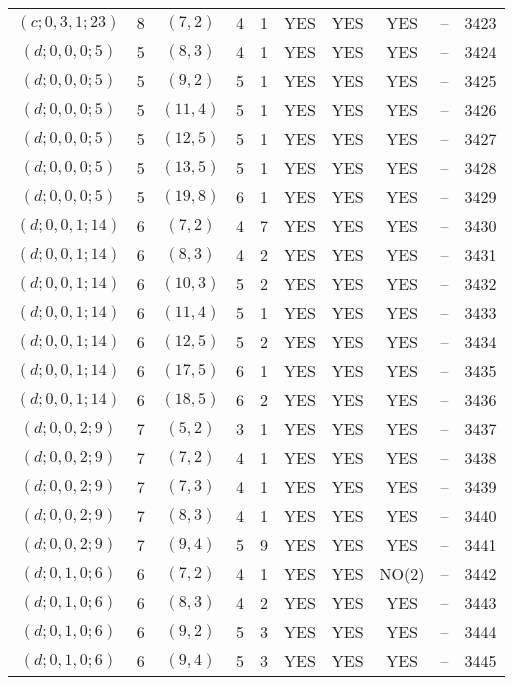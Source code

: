 \begin{longtable}{|c|c|c|c|c|c|c|c|c|c|}
$(c; 0, 3, 1; 23)$ & 8 & $(7, 2)$ & 4 & 1 & YES & YES & YES & -- & 3423\\
$(d; 0, 0, 0; 5)$ & 5 & $(8, 3)$ & 4 & 1 & YES & YES & YES & -- & 3424\\
$(d; 0, 0, 0; 5)$ & 5 & $(9, 2)$ & 5 & 1 & YES & YES & YES & -- & 3425\\
$(d; 0, 0, 0; 5)$ & 5 & $(11, 4)$ & 5 & 1 & YES & YES & YES & -- & 3426\\
$(d; 0, 0, 0; 5)$ & 5 & $(12, 5)$ & 5 & 1 & YES & YES & YES & -- & 3427\\
$(d; 0, 0, 0; 5)$ & 5 & $(13, 5)$ & 5 & 1 & YES & YES & YES & -- & 3428\\
$(d; 0, 0, 0; 5)$ & 5 & $(19, 8)$ & 6 & 1 & YES & YES & YES & -- & 3429\\
$(d; 0, 0, 1; 14)$ & 6 & $(7, 2)$ & 4 & 7 & YES & YES & YES & -- & 3430\\
$(d; 0, 0, 1; 14)$ & 6 & $(8, 3)$ & 4 & 2 & YES & YES & YES & -- & 3431\\
$(d; 0, 0, 1; 14)$ & 6 & $(10, 3)$ & 5 & 2 & YES & YES & YES & -- & 3432\\
$(d; 0, 0, 1; 14)$ & 6 & $(11, 4)$ & 5 & 1 & YES & YES & YES & -- & 3433\\
$(d; 0, 0, 1; 14)$ & 6 & $(12, 5)$ & 5 & 2 & YES & YES & YES & -- & 3434\\
$(d; 0, 0, 1; 14)$ & 6 & $(17, 5)$ & 6 & 1 & YES & YES & YES & -- & 3435\\
$(d; 0, 0, 1; 14)$ & 6 & $(18, 5)$ & 6 & 2 & YES & YES & YES & -- & 3436\\
$(d; 0, 0, 2; 9)$ & 7 & $(5, 2)$ & 3 & 1 & YES & YES & YES & -- & 3437\\
$(d; 0, 0, 2; 9)$ & 7 & $(7, 2)$ & 4 & 1 & YES & YES & YES & -- & 3438\\
$(d; 0, 0, 2; 9)$ & 7 & $(7, 3)$ & 4 & 1 & YES & YES & YES & -- & 3439\\
$(d; 0, 0, 2; 9)$ & 7 & $(8, 3)$ & 4 & 1 & YES & YES & YES & -- & 3440\\
$(d; 0, 0, 2; 9)$ & 7 & $(9, 4)$ & 5 & 9 & YES & YES & YES & -- & 3441\\
$(d; 0, 1, 0; 6)$ & 6 & $(7, 2)$ & 4 & 1 & YES & YES & NO(2) & -- & 3442\\
$(d; 0, 1, 0; 6)$ & 6 & $(8, 3)$ & 4 & 2 & YES & YES & YES & -- & 3443\\
$(d; 0, 1, 0; 6)$ & 6 & $(9, 2)$ & 5 & 3 & YES & YES & YES & -- & 3444\\
$(d; 0, 1, 0; 6)$ & 6 & $(9, 4)$ & 5 & 3 & YES & YES & YES & -- & 3445\\

\end{longtable}
